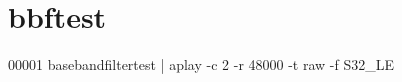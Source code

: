 \hypertarget{bbftest_source}{\section{bbftest}
\label{bbftest_source}
}

\begin{DoxyCode}
00001 basebandfiltertest | aplay -c 2 -r 48000 -t raw -f S32\_LE
\end{DoxyCode}
